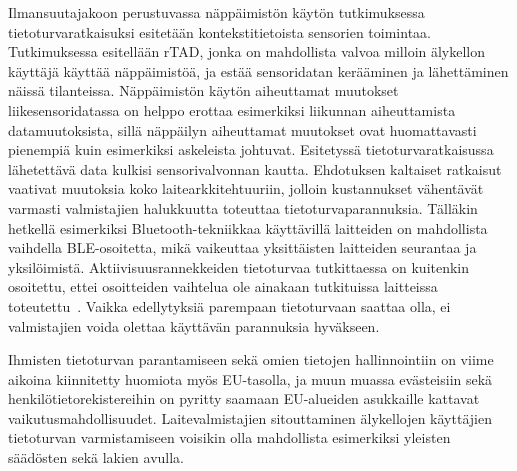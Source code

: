 \documentclass[finnish]{tktltiki2}
\theoremstyle{definition}
\theoremstyle{remark}
\begin{document}
Ilmansuutajakoon perustuvassa näppäimistön käytön tutkimuksessa~\cite{maiti} tietoturvaratkaisuksi esitetään kontekstitietoista sensorien toimintaa. Tutkimuksessa esitellään rTAD, jonka on mahdollista valvoa milloin älykellon käyttäjä käyttää näppäimistöä, ja estää sensoridatan kerääminen ja lähettäminen näissä tilanteissa. Näppäimistön käytön aiheuttamat muutokset liikesensoridatassa on helppo erottaa esimerkiksi liikunnan aiheuttamista datamuutoksista, sillä näppäilyn aiheuttamat muutokset ovat huomattavasti pienempiä kuin esimerkiksi askeleista johtuvat. Esitetyssä tietoturvaratkaisussa lähetettävä data kulkisi sensorivalvonnan kautta. Ehdotuksen kaltaiset ratkaisut vaativat muutoksia koko laitearkkitehtuuriin, jolloin kustannukset vähentävät varmasti valmistajien halukkuutta toteuttaa tietoturvaparannuksia. Tälläkin hetkellä esimerkiksi Bluetooth-tekniikkaa käyttävillä laitteiden on mahdollista vaihdella BLE-osoitetta, mikä vaikeuttaa yksittäisten laitteiden seurantaa ja yksilöimistä. Aktiivisuusrannekkeiden tietoturvaa tutkittaessa on kuitenkin osoitettu, ettei osoitteiden vaihtelua ole ainakaan tutkituissa laitteissa toteutettu~\cite{das}. Vaikka edellytyksiä parempaan tietoturvaan saattaa olla, ei valmistajien voida olettaa käyttävän parannuksia hyväkseen.

Ihmisten tietoturvan parantamiseen sekä omien tietojen hallinnointiin on viime aikoina kiinnitetty huomiota myös EU-tasolla, ja muun muassa evästeisiin sekä henkilötietorekistereihin on pyritty saamaan EU-alueiden asukkaille kattavat vaikutusmahdollisuudet. Laitevalmistajien sitouttaminen älykellojen käyttäjien tietoturvan varmistamiseen voisikin olla mahdollista esimerkiksi yleisten säädösten sekä lakien avulla.



\end{document}

